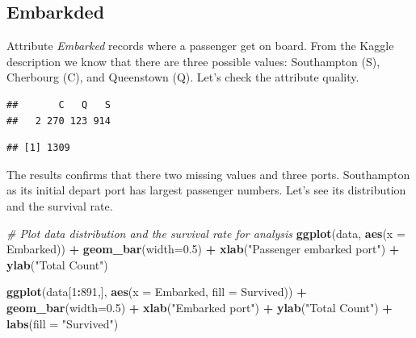 \documentclass[
]{book}
\newenvironment{Shaded}{\begin{snugshade}}{\end{snugshade}}
\newcommand{\CommentTok}[1]{\textcolor[rgb]{0.56,0.35,0.01}{\textit{#1}}}
\newcommand{\DataTypeTok}[1]{\textcolor[rgb]{0.13,0.29,0.53}{#1}}
\newcommand{\DecValTok}[1]{\textcolor[rgb]{0.00,0.00,0.81}{#1}}
\newcommand{\FloatTok}[1]{\textcolor[rgb]{0.00,0.00,0.81}{#1}}
\newcommand{\KeywordTok}[1]{\textcolor[rgb]{0.13,0.29,0.53}{\textbf{#1}}}
\newcommand{\NormalTok}[1]{#1}
\newcommand{\OperatorTok}[1]{\textcolor[rgb]{0.81,0.36,0.00}{\textbf{#1}}}
\newcommand{\StringTok}[1]{\textcolor[rgb]{0.31,0.60,0.02}{#1}}
\begin{document}
\hypertarget{embarkded}{%
\subsection*{Embarkded}\label{embarkded}}


Attribute \emph{Embarked} records where a passenger get on board. From the Kaggle description we know that there are three possible values: Southampton (S), Cherbourg (C), and Queenstown (Q). Let's check the attribute quality.

\begin{Shaded}
\end{Shaded}

\begin{verbatim}
##       C   Q   S 
##   2 270 123 914
\end{verbatim}

\begin{Shaded}
\end{Shaded}

\begin{verbatim}
## [1] 1309
\end{verbatim}

The results confirms that there two missing values and three ports. Southampton as its initial depart port has largest passenger numbers. Let's see its distribution and the survival rate.

\begin{Shaded}
\begin{Highlighting}[]
\CommentTok{# Plot data distribution and the survival rate for analysis}
\KeywordTok{ggplot}\NormalTok{(data, }\KeywordTok{aes}\NormalTok{(}\DataTypeTok{x =}\NormalTok{ Embarked)) }\OperatorTok{+}
\StringTok{  }\KeywordTok{geom_bar}\NormalTok{(}\DataTypeTok{width=}\FloatTok{0.5}\NormalTok{) }\OperatorTok{+}
\StringTok{  }\KeywordTok{xlab}\NormalTok{(}\StringTok{"Passenger embarked port"}\NormalTok{) }\OperatorTok{+}
\StringTok{  }\KeywordTok{ylab}\NormalTok{(}\StringTok{"Total Count"}\NormalTok{) }


\KeywordTok{ggplot}\NormalTok{(data[}\DecValTok{1}\OperatorTok{:}\DecValTok{891}\NormalTok{,], }\KeywordTok{aes}\NormalTok{(}\DataTypeTok{x =}\NormalTok{ Embarked, }\DataTypeTok{fill =}\NormalTok{ Survived)) }\OperatorTok{+}
\StringTok{  }\KeywordTok{geom_bar}\NormalTok{(}\DataTypeTok{width=}\FloatTok{0.5}\NormalTok{) }\OperatorTok{+}
\StringTok{   }\KeywordTok{xlab}\NormalTok{(}\StringTok{"Embarked port"}\NormalTok{) }\OperatorTok{+}
\StringTok{  }\KeywordTok{ylab}\NormalTok{(}\StringTok{"Total Count"}\NormalTok{) }\OperatorTok{+}
\StringTok{  }\KeywordTok{labs}\NormalTok{(}\DataTypeTok{fill =} \StringTok{"Survived"}\NormalTok{)}
\end{Highlighting}
\end{Shaded}
\end{document}
